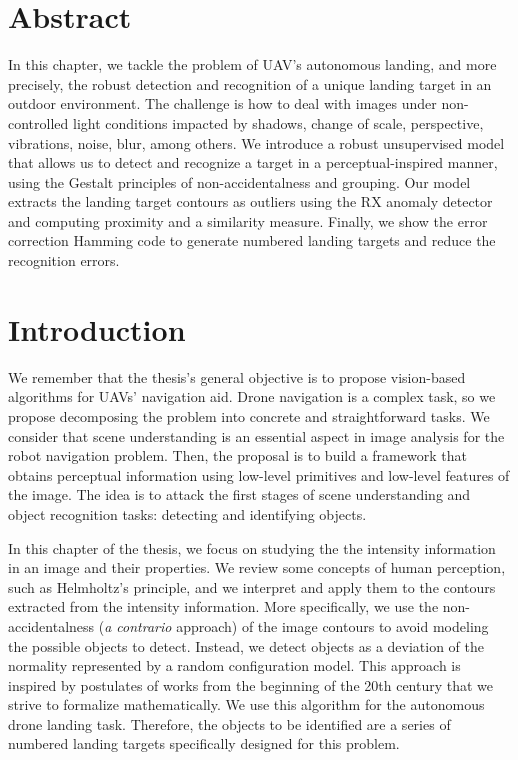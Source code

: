 \section*{Abstract}
\noindent In this chapter, we tackle the problem of UAV's autonomous landing, and more precisely, the robust detection and recognition of a unique landing target in an outdoor environment. The challenge is how to deal with images under non-controlled light conditions impacted by shadows, change of scale, perspective, vibrations, noise, blur, among others. We introduce a robust unsupervised model that allows us to detect and recognize a target in a perceptual-inspired manner, using the Gestalt principles of non-accidentalness and grouping. Our model extracts the landing target contours as outliers using the RX anomaly detector and computing proximity and a similarity measure. Finally, we show the error correction Hamming code to generate numbered landing targets and reduce the recognition errors.


\section{Introduction}\label{sec:introduction_ch1}
We remember that the thesis's general objective is to propose vision-based algorithms for UAVs' navigation aid. Drone navigation is a complex task, so we propose decomposing the problem into concrete and straightforward tasks.  We consider that scene understanding is an essential aspect in image analysis for the robot navigation problem. Then, the proposal is to build a framework that obtains perceptual information using low-level primitives and low-level features of the image. The idea is to attack the first stages of scene understanding and object recognition tasks: detecting and identifying objects.  

In this chapter of the thesis, we focus on studying the the intensity information in an image and their properties. We review some concepts of human perception, such as Helmholtz's principle, and we interpret and apply them to the contours extracted from the intensity information.  More specifically, we use the non-accidentalness (\textit{a contrario} approach) of the image contours to avoid modeling the possible objects to detect. Instead, we detect objects as a deviation of the normality represented by a random configuration model. This approach is inspired by postulates of works from the beginning of the 20th century that we strive to formalize mathematically. We use this algorithm for the autonomous drone landing task. Therefore, the objects to be identified are a series of numbered landing targets specifically designed for this problem.


